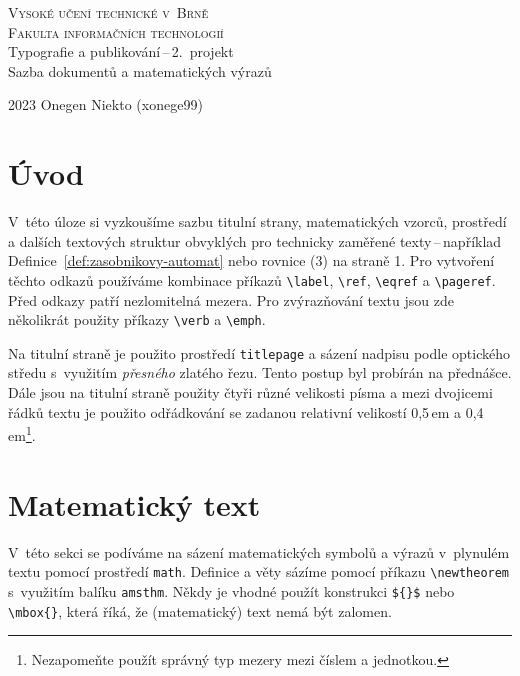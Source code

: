 \documentclass[a4paper, twocolumn, 11pt]{article}
\theoremstyle{plain}
\begin{document}
\begin{titlepage}
	\begin{center}
		{\Huge \textsc{Vysoké učení technické v~Brně}\\[0.5em]}
		{\huge \textsc{Fakulta informačních technologií}}\\
		{\LARGE Typografie a publikování\,--\,2.\ projekt\\[0.4em]
			Sazba dokumentů a matematických výrazů}\\
	\end{center}
	{\Large 2023 \hfill Onegen Niekto (xonege99)}
\end{titlepage}

\section*{Úvod}

V~této úloze si vyzkoušíme sazbu titulní strany, mate\-matických vzorců,
prostředí a dalších textových struktur obvyklých pro technicky zaměřené texty\,--\,například
Defi\-nice~\ref{def:zasobnikovy-automat} nebo rovnice (3) na straně 1. Pro vytvoření těchto odkazů
používáme kombinace příkazů \verb|\label|, \verb|\ref|, \verb|\eqref| a \verb|\pageref|.
Před odkazy patří nezlomitelná mezera.
Pro zvýrazňování textu jsou zde několikrát použity příkazy \verb|\verb| a \verb|\emph|.

Na titulní straně je použito prostředí \texttt{titlepage} a sázení nadpisu podle
optického středu s~využitím \emph{přesného} zlatého řezu. Tento postup byl probírán na přednášce.
Dále jsou na titulní straně použity čtyři různé velikosti písma a mezi dvojicemi řádků textu
je použito odřádkování se zadanou relativní velikostí 0,5\,em a
0,4\,em\footnote{Nezapomeňte použít správný typ mezery mezi číslem a jednotkou.}.

\section{Matematický text}

V~této sekci se podíváme na sázení matematických symbolů a výrazů v~plynulém textu pomocí prostředí
\texttt{math}. Definice a věty sázíme pomocí příkazu \verb|\newtheorem| s~využitím balíku
\texttt{amsthm}. Někdy je vhodné použít konstrukci \verb|${}$| nebo \verb|\mbox{}|,
která říká, že (matematický) text nemá být zalomen.
\end{document}
